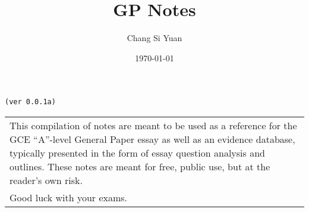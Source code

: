 \documentclass[../main]{subfiles}
\begin{document}
\author{Chang Si Yuan}
\title{GP Notes}
\date{\today}

\maketitle

\begin{center}

	\texttt{(ver 0.0.1a)}

	\vspace{50pt}

	\begin{tabular}{>{\flushleft}p{8cm}}
	This compilation of notes are meant to be used as a reference for the GCE ``A''-level General Paper essay as well as an evidence database, typically presented in the form of essay question analysis and outlines. These notes are meant for free, public use, but at the reader's own risk. \\
	Good luck with your exams.
	\end{tabular}

\end{center}

\newpage
\end{document}
